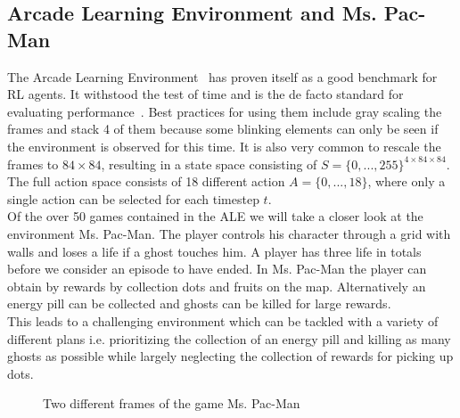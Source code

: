 \documentclass{article}
\begin{document}
\subsection{Arcade Learning Environment and Ms. Pac-Man}

The Arcade Learning Environment~\cite{DBLP:journals/corr/abs-1207-4708} has proven itself
as a good benchmark for RL agents. It withstood the test of time and is the de facto standard
for evaluating performance~\cite{DBLP:journals/corr/abs-1709-06009}. Best practices 
for using them include gray scaling the frames and stack 4 of them because some blinking
elements can only be seen if the environment is observed for this time. It is also
very common to rescale the frames to $84\times 84$, resulting in a state space consisting of $S = \{0,...,255\}^{4\times 84\times 84}$.
The full action space consists of 18 different action $A =\{0,...,18\}$, where only a single action
can be selected for each timestep $t$.\\
Of the over 50 games contained in the ALE we will take a closer look at the environment Ms. Pac-Man.
The player controls his character through a grid with walls and loses a life if a ghost
touches him. A player has three life in totals before we consider an episode to have ended.
In Ms. Pac-Man the player can obtain by rewards by collection dots and fruits on the map. Alternatively
an energy pill can be collected and ghosts can be killed for large rewards.\\
This leads to a challenging environment which can be tackled with a variety of different
plans i.e. prioritizing the collection of an energy pill and killing as many ghosts as possible
while largely neglecting the collection of rewards for picking up dots.

\begin{figure}
    \centering
    \qquad
    \caption{Two different frames of the game Ms. Pac-Man}
\end{figure}
\end{document}
